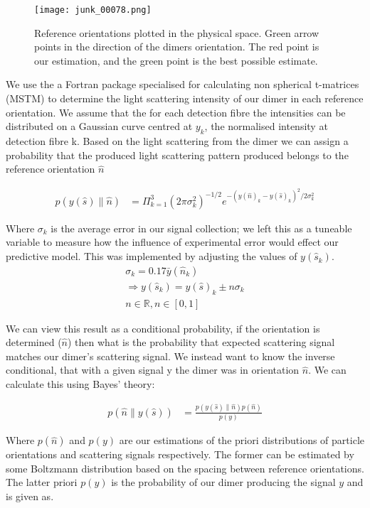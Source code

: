 \documentclass[11pt]{article}
\begin{document}
	\begin{figure}[t]
		\centering
		\texttt{[image: junk\_00078.png]}
		\caption{Reference orientations plotted in the physical space. Green arrow points in the direction of the dimers orientation. The red point is our estimation, and the green point is the best possible estimate.}
	\end{figure}
	
	We use the a Fortran package specialised for calculating non spherical t-matrices (MSTM) \cite{MSTM} to determine the light scattering intensity of our dimer in each reference orientation. We assume that the for each detection fibre the intensities can be distributed on a Gaussian curve centred at $y_k$, the normalised intensity at detection fibre k. Based on the light scattering from the dimer we can assign a probability that the produced light scattering pattern produced belongs to the reference orientation $\hat{n}$
	
	\begin{align}
		p(y(\hat{s})\parallel\hat{n})&= \Pi^3_{k=1} 
		(2\pi\sigma_k^2)^{-1/2} e^{-(y(\hat{n})_k-y(\hat{s})_k)^2/2\sigma_k^2}
	\end{align}
	
	Where $\sigma_k$ is the average error in our signal collection; we left this as a tuneable variable to measure how the influence of experimental error would effect our predictive model. This was implemented by adjusting the values of $y(\hat{s}_k)$. 
	\begin{eqnarray*}
		\sigma_k = 0.17\bar{y}(\hat{n}_k) \\
		\Rightarrow y(\hat{s}_k) = y(\hat{s})_k \pm n\sigma_k \\ 
		n \in \mathbb{R}, n\in[0,1]
	\end{eqnarray*}
	
	We can view this result as a conditional probability, if the orientation is determined ($\hat{n}$) then what is the probability that expected scattering signal matches our dimer's scattering signal. We instead want to know the inverse conditional, that with a given signal y the dimer was in orientation $\hat{n}$. We can calculate this using Bayes' theory:
	
	\begin{align}
		p(\hat{n}\parallel y(\hat{s}))&= \frac{p(y(\hat{s})\parallel\hat{n})p(\hat{n})}{p(y)}
	\end{align}
	
	Where $p(\hat{n})$ and $p(y)$ are our estimations of the priori distributions of particle orientations and scattering signals respectively. The former can be estimated by some Boltzmann distribution based on the spacing between reference orientations. The latter priori $p(y)$ is the probability of our dimer producing the signal $y$ and is given as. 
	
\end{document}
